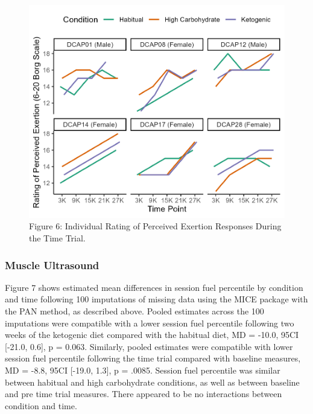 \documentclass[]{cik}%
\begin{document}
\begin{figure}[H]
\includegraphics[width=1\linewidth]{figures/figure6} \caption{Figure 6: Individual Rating of Perceived Exertion Responses During the Time Trial.}\label{fig:fig6pdf}
\end{figure}

\hypertarget{muscle-ultrasound-1}{%
\subsubsection{Muscle Ultrasound}\label{muscle-ultrasound-1}}

Figure 7 shows estimated mean differences in session fuel percentile by
condition and time following 100 imputations of missing data using the
MICE package with the PAN method, as described above. Pooled estimates
across the 100 imputations were compatible with a lower session fuel
percentile following two weeks of the ketogenic diet compared with the
habitual diet, MD = -10.0, 95CI {[}-21.0, 0.6{]}, p = 0.063. Similarly,
pooled estimates were compatible with lower session fuel percentile
following the time trial compared with baseline measures, MD = -8.8,
95CI {[}-19.0, 1.3{]}, p = .0085. Session fuel percentile was similar
between habitual and high carbohydrate conditions, as well as between
baseline and pre time trial measures. There appeared to be no
interactions between condition and time.
\end{document}
